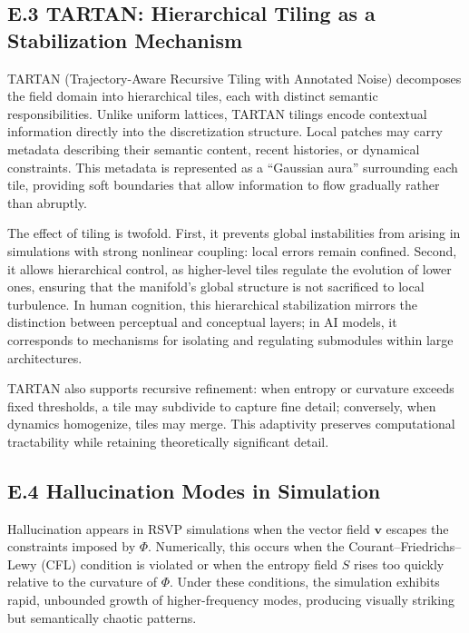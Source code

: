 \documentclass[12pt]{article}
\begin{document}
\subsection*{E.3 TARTAN: Hierarchical Tiling as a Stabilization Mechanism}

TARTAN (Trajectory-Aware Recursive Tiling with Annotated Noise) decomposes the 
field domain into hierarchical tiles, each with distinct semantic 
responsibilities. Unlike uniform lattices, TARTAN tilings encode contextual 
information directly into the discretization structure. Local patches may carry 
metadata describing their semantic content, recent histories, or dynamical 
constraints.  
This metadata is represented as a “Gaussian aura” surrounding each tile, 
providing soft boundaries that allow information to flow gradually rather than 
abruptly.

The effect of tiling is twofold.  
First, it prevents global instabilities from arising in simulations with strong 
nonlinear coupling: local errors remain confined.  
Second, it allows hierarchical control, as higher-level tiles regulate the 
evolution of lower ones, ensuring that the manifold’s global structure is not 
sacrificed to local turbulence.  
In human cognition, this hierarchical stabilization mirrors the distinction 
between perceptual and conceptual layers; in AI models, it corresponds to 
mechanisms for isolating and regulating submodules within large architectures.

TARTAN also supports recursive refinement: when entropy or curvature exceeds 
fixed thresholds, a tile may subdivide to capture fine detail; conversely, when 
dynamics homogenize, tiles may merge.  
This adaptivity preserves computational tractability while retaining 
theoretically significant detail.

\subsection*{E.4 Hallucination Modes in Simulation}

Hallucination appears in RSVP simulations when the vector field $\mathbf{v}$ 
escapes the constraints imposed by $\Phi$. Numerically, this occurs when the 
Courant–Friedrichs–Lewy (CFL) condition is violated or when the entropy field $S$ 
rises too quickly relative to the curvature of $\Phi$.  
Under these conditions, the simulation exhibits rapid, unbounded growth of 
higher-frequency modes, producing visually striking but semantically chaotic 
patterns.
\end{document}
